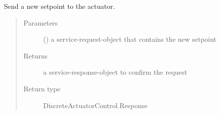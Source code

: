 \documentclass[a4paper,12pt,twoside]{article}
\begin{document}
\begin{fulllineitems}
\begin{fulllineitems}
\begin{quote}
\begin{description}
\end{description}\end{quote}

\end{fulllineitems}


\begin{fulllineitems}
\label{\detokenize{meso_control_pkg:meso_control_pkg.sps_discrete_actuator_node.SpsDiscreteActuator.set_actuator}}
Send a new setpoint to the actuator.
\begin{quote}\begin{description}
\item[{Parameters}] \leavevmode
{} () \textendash{} a service-request-object that contains the new setpoint

\item[{Returns}] \leavevmode
a service-response-object to confirm the request

\item[{Return type}] \leavevmode
DiscreteActuatorControl.Response

\end{description}\end{quote}

\end{fulllineitems}


\end{fulllineitems}

\label{\detokenize{meso_control_pkg:module-meso_control_pkg.sps_continuous_actuator_node}}
\end{document}
